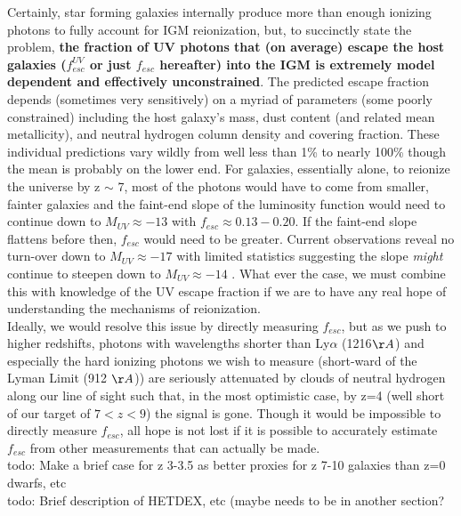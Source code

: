 \documentclass{aastex62}
\begin{document}
Certainly, star forming galaxies internally produce more than enough ionizing photons to fully account for IGM reionization, but, to succinctly state the problem, \textbf{the fraction of UV photons that (on average) escape the host galaxies ($f^{UV}_{esc}$ or just $f_{esc}$ hereafter) into the IGM is extremely model dependent and effectively unconstrained}. The predicted escape fraction depends (sometimes very sensitively) on a myriad of parameters (some poorly constrained) including the host galaxy's mass, dust content (and related mean metallicity), and neutral hydrogen column density and covering fraction. These individual predictions vary wildly from well less than 1\% to nearly 100\% \cite{Zackrisson} though the mean is probably on the lower end. For galaxies, essentially alone, to reionize the universe by z $\sim$ 7, most of the photons would have to come from smaller, fainter galaxies and the faint-end slope of the luminosity function would need to continue down to $M_{UV} \approx -13$ with $f_{esc} \approx 0.13 - 0.20$. If the faint-end slope flattens before then, $f_{esc}$ would need to be greater. Current observations reveal no turn-over down to $M_{UV} \approx -17$ with limited statistics suggesting the slope \textit{might} continue to steepen down to $M_{UV} \approx -14$ \cite{Livermore}. What ever the case, we must combine this with knowledge of the UV escape fraction if we are to have any real hope of understanding the mechanisms of reionization.\\

Ideally, we would resolve this issue by directly measuring $f_{esc}$, but as we push to higher redshifts, photons with wavelengths shorter than Ly$\alpha$ (1216$\AA$) and especially the hard ionizing photons we wish to measure (short-ward of the Lyman Limit (912 $\AA$)) are seriously attenuated by clouds of neutral hydrogen along our line of sight such that, in the most optimistic case, by z=4 (well short of our target of $7 < z < 9$) the signal is gone. Though it would be impossible to directly measure $f_{esc}$, all hope is not lost if it is possible to accurately estimate $f_{esc}$ from other measurements that can actually be made.\\



{ \color{red} todo: Make a brief case for z 3-3.5 as better proxies for z 7-10 galaxies than z=0 dwarfs, etc}\\

{ \color{red} todo: Brief description of HETDEX, etc (maybe needs to be in another section?}\\
\end{document}
